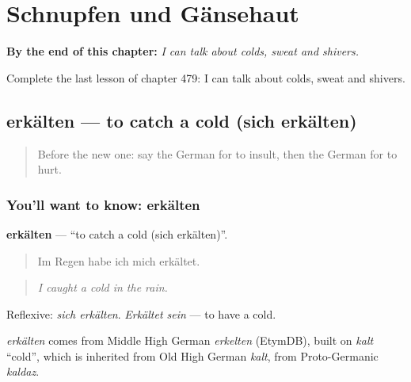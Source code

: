 
\chapter{Schnupfen und Gänsehaut}
\label{ch:ge-schnupfen-und-gansehaut}

\begin{chapteropening}
\textbf{By the end of this chapter:} \emph{I can talk about colds, sweat and shivers.}

Complete the last lesson of chapter 479: I can talk about colds, sweat and shivers.
\end{chapteropening}

\section[erkälten]{erkälten — to catch a cold (sich erkälten)}

\label{lesson:GE-C479-erkaelten}



\begin{quote}
Before the new one: say the German for to insult, then the German for to hurt.
\end{quote}

\subsection*{You'll want to know: erkälten}
\textbf{erkälten} — \textquotedblleft{}to catch a cold (sich erkälten)\textquotedblright{}.

\begin{quote}
Im Regen habe ich mich erkältet.
\end{quote}

\begin{quote}
\emph{I caught a cold in the rain.}
\end{quote}

Reflexive: \emph{sich erkälten}. \emph{Erkältet sein} — to have a cold.

\begin{cousinweb}
\emph{erkälten} comes from Middle High German \emph{erkelten} (EtymDB), built on \emph{kalt} \textquotedblleft{}cold\textquotedblright{}, which is inherited from Old High German \emph{kalt}, from Proto-Germanic \emph{kaldaz}.
\end{cousinweb}

